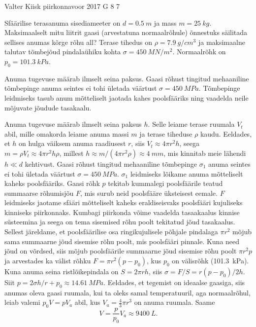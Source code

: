 {Valter Kiisk} %
{piirkonnavoor} %
{2017} %
{G 8} %
{7} %
{
\ifStatement
Sfäärilise terasanuma sisediameeter on $d=\SI{0.5}{m}$ ja mass $m=\SI{25}{kg}$. Maksimaalselt mitu liitrit gaasi (arvestatuna normaalrõhule) õnnestuks säilitada sellises anumas kõrge rõhu all? Terase tihedus on $\rho=\SI{7.9}{g/cm^3}$ ja maksimaalne talutav tõmbejõud pindalaühiku kohta $\sigma=\SI{450}{MN/m^2}$. Normaalrõhk on $p_0=\SI{101.3}{kPa}$.
\fi


\ifHint
Anuma tugevuse määrab ilmselt seina paksus. Gaasi rõhust tingitud mehaaniline tõmbepinge anuma seintes ei tohi ületada väärtust $\sigma=\SI{450}{MPa}$. Tõmbepinge leidmiseks tasub anum mõtteliselt jaotada kahes poolsfääriks ning vaadelda neile mõjuvate jõudude tasakaalu.
\fi


\ifSolution
Anuma tugevuse määrab ilmselt seina paksus $h$. Selle leiame terase ruumala $V_t$ abil, mille omakorda leiame anuma massi $m$ ja terase tiheduse $\rho$ kaudu. Eeldades, et $h$ on hulga väiksem anuma raadiusest $r$, siis $V_t\approx4\pi r^2 h$, seega $m=\rho V_t \approx 4\pi r^2h\rho$, millest $h\approx m/(4\pi r^2\rho)\approx \SI{4}{mm}$, mis kinnitab meie lähendi $h\ll d$ kehtivust. Gaasi rõhust tingitud mehaaniline tõmbepinge $\sigma_1$ anuma seintes ei tohi ületada väärtust $\sigma=\SI{450}{MPa}$. $\sigma_1$ leidmiseks lõikame anuma mõtteliselt kaheks poolsfääriks.
Gaasi rõhk $p$ tekitab kummalegi poolsfäärile teatud summaarse rõhumisjõu $F$, mis surub neid poolsfääre üksteisest eemale. $F$ leidmiseks jaotame sfääri mõtteliselt kaheks eraldiseisvaks poolsfääri kujuliseks kinniseks piirkonnaks. Kumbagi piirkonda võime vaadelda tasaakaalus kinnise süsteemina ja seega on tema sisemised rõhu poolt tekitatud jõud tasakaalus. Sellest järeldame, et poolsfäärilise osa ringikujulisele põhjale pindalaga $\pi r^2$ mõjub sama summaarne jõud sisemise rõhu poolt, mis poolsfääri pinnale. Kuna need jõud on võrdsed, siis mõjub poolsfäärile summaarne jõud sisemise rõhu poolt $\pi r^2 p$ ja arvestades ka välist rõhku $F=\pi r^2(p-p_0)$, kus $p_0$ on välisrõhk (\SI{101.3}{kPa}). Kuna anuma seina ristlõikepindala on $S=2\pi rh$, siis $\sigma=F/S=r(p-p_0)/2h$. Siit $p=2\sigma h/r+p_0\approx \SI{14.61}{MPa}$. Eeldades, et tegemist on ideaalse gaasiga, siis anumas oleva gaasi ruumala, kui ta oleks samal temperatuuril, aga normaalrõhul, leiab valemi $p_0V=pV_a$ abil, kus $V_a=\frac{4}{3}\pi r^3$ on anuma ruumala. Saame
\[
V=\frac{p}{p_0}V_a\approx\SI{9400}{L}.
\]
\fi


}
